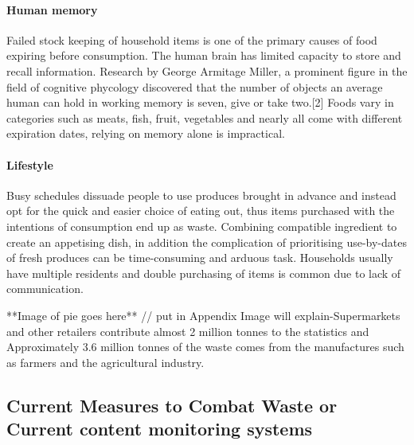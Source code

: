 \documentclass[a4paper, 11pt]{article}
\begin{document}
\paragraph{Human memory} Failed stock keeping of household items is one of the primary causes of food expiring before consumption. The human brain has limited capacity to store and recall information. Research by George Armitage Miller, a prominent figure in the field of cognitive phycology discovered that the number of objects an average human can hold in working memory is seven, give or take two.[2] Foods vary in categories such as meats, fish, fruit, vegetables and nearly all come with different expiration dates, relying on memory alone is impractical. 

\paragraph{Lifestyle} Busy schedules dissuade people to use produces brought in advance and instead opt for the quick and easier choice of eating out, thus items purchased with the intentions of consumption end up as waste. Combining compatible ingredient to create an appetising dish, in addition the complication of prioritising use-by-dates of fresh produces can be time-consuming and arduous task. Households usually have multiple residents and double purchasing of items is common due to lack of communication. 

\vspace{\baselineskip}

**Image of pie goes here** // put in Appendix
Image will explain-Supermarkets and other retailers contribute almost 2 million tonnes to the statistics and Approximately 3.6 million tonnes of the waste comes from the manufactures such as farmers and the agricultural industry. 

\vspace{\baselineskip}
\vspace{\baselineskip}
\vspace{\baselineskip}

\subsection{Current Measures to Combat Waste or Current content monitoring systems}
\end{document}
